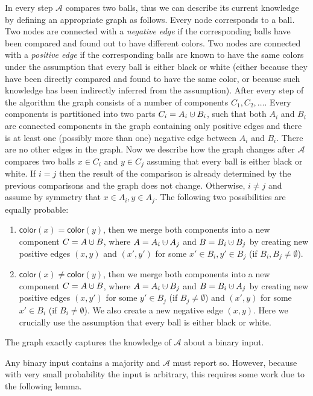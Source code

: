 \documentclass{article}[11pt,a4paper]
\newcommand{\ballcolor}{\mathsf{color}}
\newcommand{\cupdot}{\mathbin{\mathaccent\cdot\cup}}
\begin{document}
In every step $\mathcal{A}$ compares two balls, thus we can describe its current knowledge by defining
an appropriate graph as follows. Every node corresponds to a ball. Two nodes are connected with
a \emph{negative edge} if the corresponding balls have been compared and found out to have
different colors. Two nodes
are connected with a \emph{positive edge} if the corresponding balls are known to have the same
colors under the assumption that every ball is either black or white (either because they have been
directly compared and found to have the same color, or because such knowledge has been indirectly
inferred from the assumption).
After every step of the algorithm the graph consists of a number of components $C_1,C_2,\ldots$.
Every components is partitioned into two parts $C_i = A _i \cupdot B_i$, such that both $A_i$ and
$B_i$ are connected components in the graph containing only positive edges and there is at least one
(possibly more than one) negative edge between $A_i$ and $B_i$. There are no other edges in the graph.
Now we describe how the graph changes after $\mathcal{A}$ compares two balls $x\in C_i$ and $y\in C_j$
assuming that every ball is either black or white. 
If $i=j$ then the result of the comparison is already determined by the previous comparisons and
the graph does not change. Otherwise, $i\neq j$ and assume by symmetry that $x\in A_i, y\in A_j$.
The following two possibilities are equally probable:
\begin{enumerate}
\item $\ballcolor(x) = \ballcolor(y)$, then we merge both components into a new component
$C = A \cupdot B$, where $A = A_i \cupdot A_j$ and $B = B_i \cupdot B_j$ by creating new
positive edges $(x,y)$ and $(x',y')$ for some $x'\in B_i, y'\in B_j$ (if $B_i ,B_j\neq\emptyset$).
\item $\ballcolor(x) \neq \ballcolor(y)$,  then we merge both components into a new component
$C = A  \cupdot B$, where $A = A_i \cupdot B_j$ and $B = B_i \cupdot A_j$ by creating 
new positive edges $(x,y')$ for some $y'\in B_j$ (if $B_j\neq \emptyset$) and
$(x',y)$ for some $x'\in B_i$ (if $B_i\neq\emptyset$). We also create a new
negative edge $(x,y)$. Here we
crucially use the assumption that every ball is either black or white.
\end{enumerate}
The graph exactly captures the knowledge of $\mathcal{A}$ about a binary input. 

Any binary input contains a majority and $\mathcal{A}$ must report so. However, because with
very small probability the input is arbitrary, this requires some work due to the following
lemma.
\end{document}

